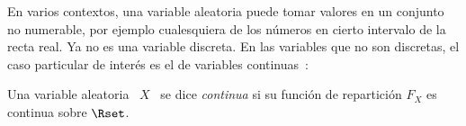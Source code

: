 
\label{Ssec:MP:VAContinua}

En varios contextos,  una variable aleatoria puede tomar  valores en un conjunto
no numerable, por  ejemplo cualesquiera de los n\'umeros  en cierto intervalo de
la recta  real. Ya  no es  una variable discreta.  En las  variables que  no son
discretas,   el   caso   particular    de   inter\'es   es   el   de   variables
continuas~\cite{AshDol99, AthLah06, HogMck13}:
%
\begin{definicion}
\label{Def:MP:VariableAleatoriaContinua}
%
  Una variable  aleatoria \  $X$ \ se  dice {\it  continua} si su  funci\'on de
  repartici\'on  $F_X$ es  continua sobre  $\Rset$.
\end{definicion}

